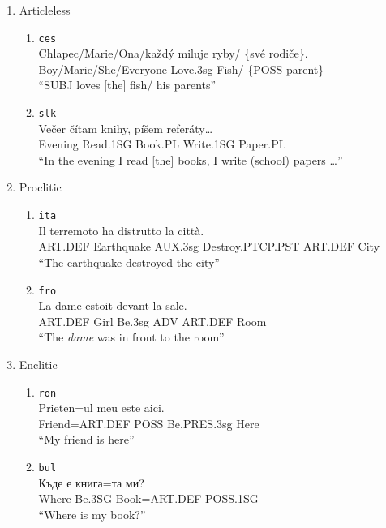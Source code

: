 \documentclass[a4paper,twoside,12pt,chapterprefix=false,listof=flat]{scrartcl}
\providecommand{\tightlist}{%
  \setlength{\itemsep}{0pt}\setlength{\parskip}{0pt}}
\theoremstyle{plain} %
\theoremstyle{definition}
\theoremstyle{remark}
\begin{document}
\begin{enumerate}
\def\labelenumi{(\arabic{enumi})}
\tightlist
\item
  Articleless \label{exm:dpNo}

  \begin{enumerate}
  \def\labelenumii{\alph{enumii}.}
  \tightlist
  \item
    \texttt{ces} \citep[ 14]{veselovska2014}\\
    \gll    Chlapec/Marie/Ona/každý miluje ryby/ \{své rodiče\}.\\
    Boy/Marie/She/Everyone Love.3sg Fish/ \{POSS parent\}\\
    \glt    \enquote{SUBJ loves {[}the{]} fish/ his parents}
  \item
    \texttt{slk} \citep[ 113]{krizomkrazomA1}\\
    \gll    Večer čítam knihy, píšem referáty\ldots{}\\
    Evening Read.1SG Book.PL Write.1SG Paper.PL\\
    \glt    \enquote{In the evening I read {[}the{]} books, I write
    (school) papers \ldots{}}
  \end{enumerate}
\item
  Proclitic \label{exm:dpPre}

  \begin{enumerate}
  \def\labelenumii{\alph{enumii}.}
  \tightlist
  \item
    \texttt{ita} \citep[ 60]{bianco2017}\\
    \gll    Il terremoto ha distrutto la città.\\
    ART.DEF Earthquake AUX.3sg Destroy.PTCP.PST ART.DEF City\\
    \glt    \enquote{The earthquake destroyed the city}
  \item
    \texttt{fro} \citep[ 3261]{dedole2008}\\
    \gll    La dame estoit devant la sale.\\
    ART.DEF Girl Be.3sg ADV ART.DEF Room\\
    \glt    \enquote{The \emph{dame} was in front to the room}
  \end{enumerate}
\item
  Enclitic

  \begin{enumerate}
  \def\labelenumii{\alph{enumii}.}
  \tightlist
  \item
    \texttt{ron} \citep[ 45]{cojocaru2003} \label{exm:dpRon}\\
    \gll    Prieten=ul meu este aici.\\
    Friend=ART.DEF POSS Be.PRES.3sg Here\\
    \glt    \enquote{My friend is here}
  \item
    \texttt{bul} \citep[ 37]{leafgren2011} \label{exm:dpBul}\\
    \gll    Къде е книга=та ми?\\
    Where Be.3SG Book=ART.DEF POSS.1SG\\
    \glt    \enquote{Where is my book?}
  \end{enumerate}
\end{enumerate}
\end{document}
